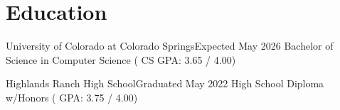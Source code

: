 \section{Education}
    \resumeSubHeadingListStart

    \resumeSubheading
    {University of Colorado at Colorado Springs}{Expected May 2026}
    {Bachelor of Science in Computer Science ( CS GPA: 3.65 / 4.00)}{}

    \resumeSubheading
    {Highlands Ranch High School}{Graduated May 2022}
    {High School Diploma w/Honors ( GPA: 3.75 / 4.00)}{}

    \resumeSubHeadingListEnd